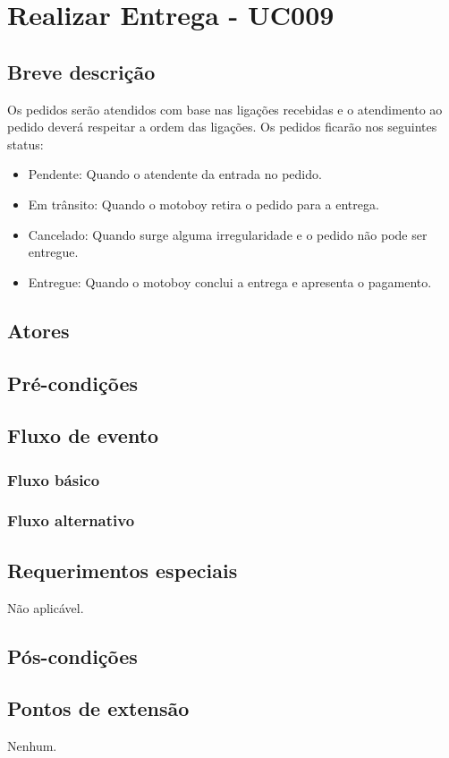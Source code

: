 \chapter{Realizar Entrega - UC009} \label{uc009}

\section{Breve descrição}

Os pedidos serão atendidos com base nas ligações recebidas e o atendimento ao pedido deverá respeitar a ordem das ligações. Os pedidos ficarão nos seguintes status:

\begin{itemize}
	\item Pendente: Quando o atendente da entrada no pedido.
	\item Em trânsito: Quando o motoboy retira o pedido para a entrega.
	\item Cancelado: Quando surge alguma irregularidade e o pedido não pode ser entregue.
	\item Entregue: Quando o motoboy conclui a entrega e apresenta o pagamento.
\end{itemize}

\section{Atores}

\section{Pré-condições}

\section{Fluxo de evento}

\subsection{Fluxo básico}

\subsection{Fluxo alternativo}

\section{Requerimentos especiais}

Não aplicável.

\section{Pós-condições}

\section{Pontos de extensão}

Nenhum.